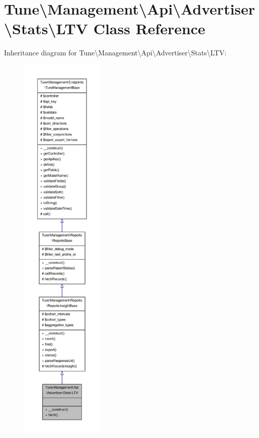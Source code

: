 \hypertarget{classTune_1_1Management_1_1Api_1_1Advertiser_1_1Stats_1_1LTV}{\section{Tune\textbackslash{}Management\textbackslash{}Api\textbackslash{}Advertiser\textbackslash{}Stats\textbackslash{}L\-T\-V Class Reference}
\label{classTune_1_1Management_1_1Api_1_1Advertiser_1_1Stats_1_1LTV}
}


Inheritance diagram for Tune\textbackslash{}Management\textbackslash{}Api\textbackslash{}Advertiser\textbackslash{}Stats\textbackslash{}L\-T\-V\-:
\nopagebreak
\begin{figure}[H]
\begin{center}
\leavevmode
\includegraphics[height=550pt]{classTune_1_1Management_1_1Api_1_1Advertiser_1_1Stats_1_1LTV__inherit__graph}
\end{center}
\end{figure}


